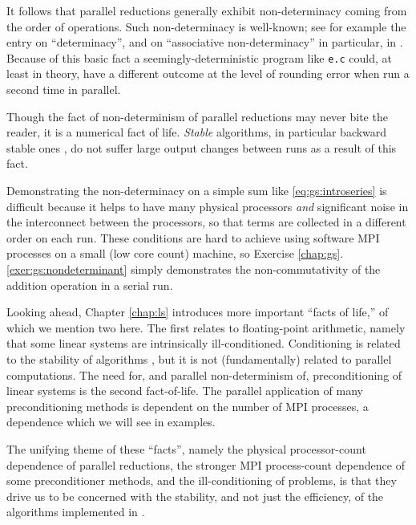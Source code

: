 It follows that parallel reductions generally exhibit non-determinacy coming from the order of operations.  Such non-determinacy is well-known; see for example the entry on ``determinacy'', and on ``associative non-determinacy'' in particular, in \citep{Padua2011}.  Because of this basic fact a seemingly-deterministic program like \texttt{e.c} could, at least in theory, have a different outcome at the level of rounding error when run a second time in parallel.

Though the fact of non-determinism of parallel reductions may never bite the reader, it is a numerical fact of life.  \emph{Stable} algorithms, in particular backward stable ones \citep{TrefethenBau1997}, do not suffer large output changes between runs as a result of this fact.

Demonstrating the non-determinacy on a simple sum like \eqref{eq:gs:introseries} is difficult because it helps to have many physical processors \emph{and} significant noise in the interconnect between the processors, so that terms are collected in a different order on each run.  These conditions are hard to achieve using software MPI processes on a small (low core count) machine, so Exercise \ref{chap:gs}.\ref{exer:gs:nondeterminant} simply demonstrates the non-commutativity of the addition operation in a serial run.

Looking ahead, Chapter \ref{chap:ls} introduces more important ``facts of life,'' of which we mention two here.  The first relates to floating-point arithmetic, namely that some linear systems are intrinsically ill-conditioned.  Conditioning is related to the stability of algorithms \citep{TrefethenBau1997}, but it is not (fundamentally) related to parallel computations.  The need for, and parallel non-determinism of, preconditioning of linear systems is the second fact-of-life.  The parallel application of many preconditioning methods is dependent on the number of MPI processes, a dependence which we will see in examples.

The unifying theme of these ``facts'', namely the physical processor-count dependence of parallel reductions, the stronger MPI process-count dependence of some preconditioner methods, and the ill-conditioning of problems, is that they drive us to be concerned with the stability, and not just the efficiency, of the algorithms implemented in \PETSc.


